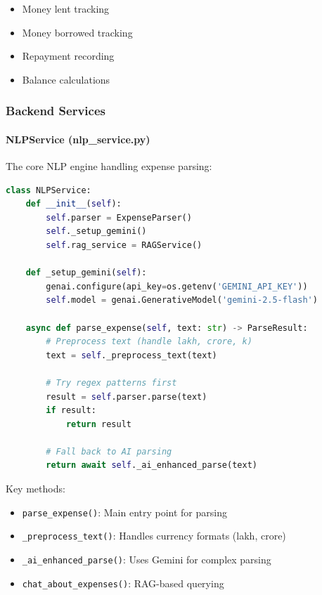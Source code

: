 \begin{itemize}
    \item Money lent tracking
    \item Money borrowed tracking
    \item Repayment recording
    \item Balance calculations
\end{itemize}

\subsubsection{Backend Services}

\paragraph{NLPService (nlp\_service.py)}

The core NLP engine handling expense parsing:

\begin{lstlisting}[language=Python, caption=NLPService Implementation]
class NLPService:
    def __init__(self):
        self.parser = ExpenseParser()
        self._setup_gemini()
        self.rag_service = RAGService()
        
    def _setup_gemini(self):
        genai.configure(api_key=os.getenv('GEMINI_API_KEY'))
        self.model = genai.GenerativeModel('gemini-2.5-flash')
        
    async def parse_expense(self, text: str) -> ParseResult:
        # Preprocess text (handle lakh, crore, k)
        text = self._preprocess_text(text)
        
        # Try regex patterns first
        result = self.parser.parse(text)
        if result:
            return result
            
        # Fall back to AI parsing
        return await self._ai_enhanced_parse(text)
\end{lstlisting}

Key methods:
\begin{itemize}
    \item \texttt{parse\_expense()}: Main entry point for parsing
    \item \texttt{\_preprocess\_text()}: Handles currency formats (lakh, crore)
    \item \texttt{\_ai\_enhanced\_parse()}: Uses Gemini for complex parsing
    \item \texttt{chat\_about\_expenses()}: RAG-based querying
\end{itemize}

